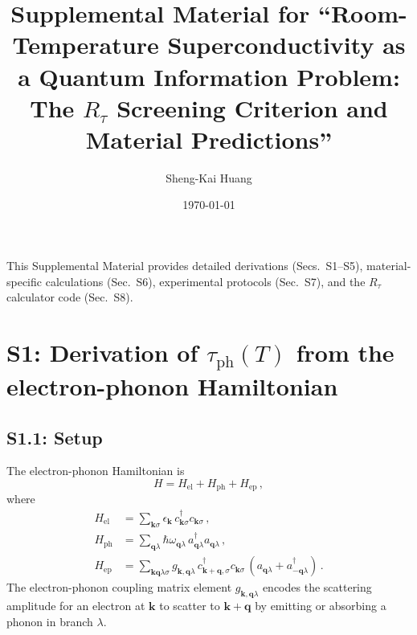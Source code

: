 \documentclass[prb,twocolumn,superscriptaddress,longbibliography,floatfix]{revtex4-2}
\newcommand{\tauasym}{\tau}
\newcommand{\taudec}{\tauasym_{\mathrm{ph}}}
\newcommand{\Rtau}{R_{\tauasym}}
\begin{document}
\title{Supplemental Material for ``Room-Temperature Superconductivity as a
Quantum Information Problem: The $R_\tau$ Screening Criterion and
Material Predictions''}

\author{Sheng-Kai Huang}

\date{\today}

\maketitle

This Supplemental Material provides detailed derivations
(Secs.~S1--S5), material-specific calculations (Sec.~S6),
experimental protocols (Sec.~S7), and the $\Rtau$ calculator
code (Sec.~S8).

\section{S1: Derivation of $\taudec(T)$ from the electron-phonon
Hamiltonian}
\label{sec:S1}

\subsection{S1.1: Setup}

The electron-phonon Hamiltonian is
\begin{equation}\label{eq:S1_Hep}
  H = H_{\mathrm{el}} + H_{\mathrm{ph}} + H_{\mathrm{ep}}\,,
\end{equation}
where
\begin{align}
  H_{\mathrm{el}} &= \sum_{\bm{k}\sigma} \epsilon_{\bm{k}}\,
  c_{\bm{k}\sigma}^\dagger c_{\bm{k}\sigma}\,, \\
  H_{\mathrm{ph}} &= \sum_{\bm{q}\lambda} \hbar\omega_{\bm{q}\lambda}\,
  a_{\bm{q}\lambda}^\dagger a_{\bm{q}\lambda}\,, \\
  H_{\mathrm{ep}} &= \sum_{\bm{k}\bm{q}\lambda\sigma}
  g_{\bm{k},\bm{q}\lambda}\,
  c_{\bm{k}+\bm{q},\sigma}^\dagger c_{\bm{k}\sigma}\,
  (a_{\bm{q}\lambda} + a_{-\bm{q}\lambda}^\dagger)\,.
\end{align}
The electron-phonon coupling matrix element $g_{\bm{k},\bm{q}\lambda}$
encodes the scattering amplitude for an electron at $\bm{k}$
to scatter to $\bm{k}+\bm{q}$ by emitting or absorbing a phonon
in branch $\lambda$.
\end{document}
